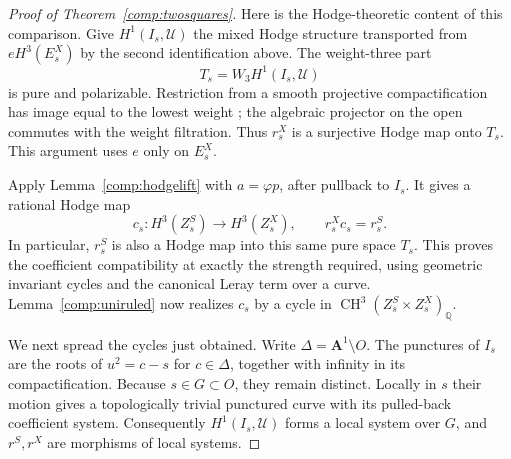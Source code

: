 \documentclass[11pt]{amsart}
\newcommand{\Q}{\mathbb Q}
\renewcommand{\AA}{\mathbf A}
\DeclareMathOperator{\CH}{CH}
\theoremstyle{definition}
\theoremstyle{remark}
\numberwithin{equation}{section}
\begin{document}
\begin{proof}[Proof of Theorem~\ref{comp:twosquares}]
Here is the Hodge-theoretic content of this comparison.  Give
$H^1(I_s,\mathscr U)$ the mixed Hodge structure transported from
$eH^3(E_s^X)$ by the second identification above.  The weight-three part
\[
 T_s=W_3H^1(I_s,\mathscr U)
\]
is pure and polarizable.  Restriction from a smooth projective
compactification has image equal to the lowest weight
\cite[Corollary~3.2.17]{DeligneHodgeII}; the algebraic projector on the
open commutes with the weight filtration.  Thus $r_s^X$ is a surjective
Hodge map onto $T_s$.  This argument uses $e$ only on $E_s^X$.

Apply Lemma~\ref{comp:hodgelift} with $a=\varphi p$, after pullback to
$I_s$.  It gives a rational Hodge map
\[
 c_s:H^3(Z_s^S)\longrightarrow H^3(Z_s^X),
 \qquad r_s^Xc_s=r_s^S.
\]
In particular, $r_s^S$ is also a Hodge map into this same pure space
$T_s$.  This proves the coefficient compatibility at exactly the
strength required, using geometric invariant cycles and the canonical
Leray term over a curve.  Lemma~\ref{comp:uniruled} now realizes $c_s$
by a cycle in $\CH^3(Z_s^S\times Z_s^X)_\Q$.

We next spread the cycles just obtained.  Write
$\Delta=\AA^1\setminus O$.  The punctures of $I_s$ are the roots of
$u^2=c-s$ for $c\in\Delta$, together with infinity in its compactification.
Because $s\in G\subset O$, they remain distinct.  Locally in $s$ their
motion gives a topologically trivial punctured curve with its pulled-back
coefficient system.  Consequently $H^1(I_s,\mathscr U)$ forms a local
system over $G$, and $r^S,r^X$ are morphisms of local systems.


\end{proof}
\end{document}
